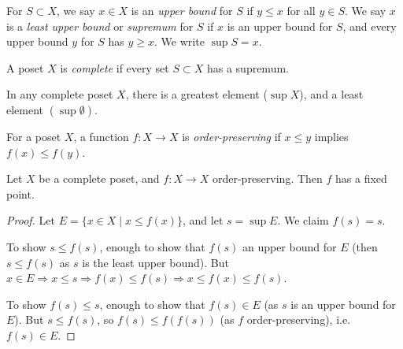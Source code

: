 \documentclass[a3paper, 10pt]{article}
\renewcommand{\vocab}[1]{\emph{#1}}
\begin{document}
\begin{multicols*}{5}

\begin{definition}[Supremum]
  For $S \subset X$, we say $x \in X$ is an \vocab{upper bound} for $S$ if $y \leq x$ for all $y \in S$. We say $x$ is a \vocab{least upper bound} or \vocab{supremum} for $S$ if $x$ is an upper bound for $S$, and every upper bound $y$ for $S$ has $y \geq x$. We write $\sup S = x$.
\end{definition}

\begin{definition}[Complete]
  A poset $X$ is \vocab{complete} if every set $S \subset X$ has a supremum.
\end{definition}

In any complete poset $X$, there is a greatest element ($\sup X$), and a least element $(\sup \emptyset)$.

\begin{definition}
  For a poset $X$, a function $f: X \rightarrow X$ is \vocab{order-preserving} if $x \leq y$ implies $f(x) \leq f(y)$.
\end{definition}

\begin{theorem}
  Let $X$ be a complete poset, and $f: X \rightarrow X$ order-preserving. Then $f$ has a fixed point.
\end{theorem}
\begin{proof}
  Let $E = \{x \in X \mid x \leq f(x)\}$, and let $s = \sup E$. We claim $f(s) =s$.

  To show $s \leq f(s)$, enough to show that $f(s)$ an upper bound for $E$ (then $s \leq f(s)$ as $s$ is the least upper bound). But $x \in E \Rightarrow x \leq s \Rightarrow f(x) \leq f(s) \Rightarrow x \leq f(x) \leq f(s)$.

To show $f(s) \leq s$, enough to show that $f(s) \in E$ (as $s$ is an upper bound for $E$). But $s \leq f(s)$, so $f(s) \leq f(f(s))$ (as $f$ order-preserving), i.e. $f(s) \in E$.
\end{proof}


\end{multicols*}
\end{document}
